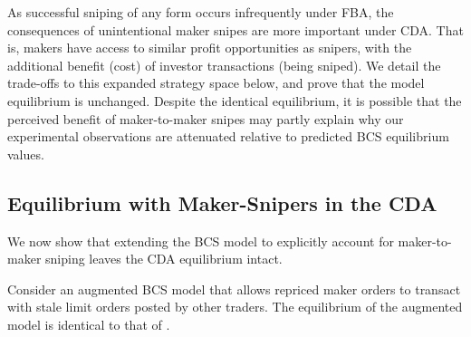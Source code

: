 \documentclass[12pt]{article}
\begin{document}
\begin{appendices}
As successful sniping of any form occurs infrequently under FBA, the consequences of unintentional maker snipes are more important under CDA. That is, makers have access to  similar profit opportunities as snipers, with the additional benefit (cost) of investor transactions (being sniped). We detail the trade-offs to this expanded strategy space below, and prove that the model equilibrium is unchanged. Despite the identical equilibrium, it is possible that the perceived benefit of maker-to-maker snipes may partly explain why our experimental observations are attenuated relative to predicted BCS equilibrium values.

\subsection{Equilibrium with Maker-Snipers in the CDA}
\label{sec:makerSniper}

We now show that extending the BCS model to explicitly account for maker-to-maker sniping leaves the CDA equilibrium intact. 

\begin{proposition} \label{bcsMakerSniping}
Consider an augmented BCS model that allows repriced maker orders to transact with stale limit orders posted by other traders. The equilibrium of the augmented model is identical to that of \citet{Budish2015}.
\end{proposition}


\end{appendices}
\end{document}

